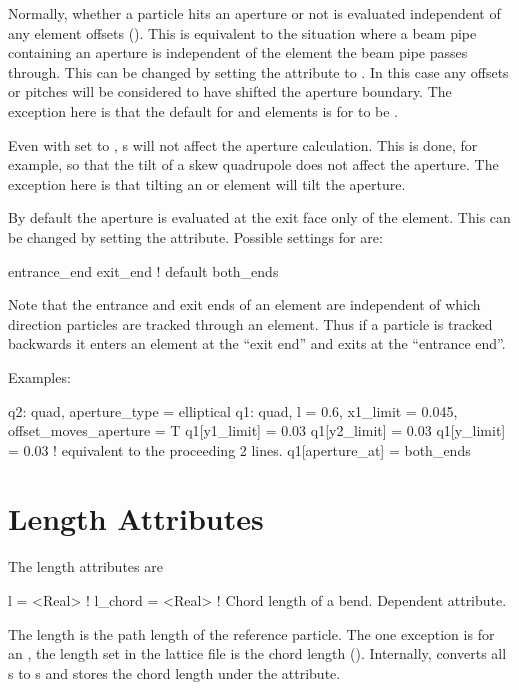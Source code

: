 Normally, whether a particle hits an aperture or not is evaluated
independent of any element offsets (). This is
equivalent to the situation where a beam pipe containing an aperture
is independent of the element the beam pipe passes through. This can
be changed by setting the  attribute to
. In this case any offsets or pitches will be considered to
have shifted the aperture boundary. The exception here is that the
default for  and  elements is for
 to be .

Even with  set to , s will
not affect the aperture calculation. This is done, for example, so
that the tilt of a skew quadrupole does not affect the aperture. The
exception here is that tilting an  or 
element will tilt the aperture.

By default the aperture is evaluated at the exit face only of the
element. This can be changed by setting the  attribute.
Possible settings for  are:
\begin{example}
  entrance_end
  exit_end  ! default
  both_ends
\end{example}
Note that the entrance and exit ends of an element are independent of
which direction particles are tracked through an element. Thus if a
particle is tracked backwards it enters an element at the ``exit end''
and exits at the ``entrance end''.

Examples:
\begin{example}
  q2: quad, aperture_type = elliptical  
  q1: quad, l = 0.6, x1_limit = 0.045, offset_moves_aperture = T
  q1[y1_limit] = 0.03
  q1[y2_limit] = 0.03
  q1[y_limit] = 0.03  ! equivalent to the proceeding 2 lines.  
  q1[aperture_at] = both_ends
\end{example}

\section{Length Attributes}
\label{s:l}

The length attributes are
\begin{example}
  l       = <Real>  ! 
  l_chord = <Real>  ! Chord length of a bend. Dependent attribute.
\end{example}
The length  is the path length of the reference particle. The
one exception is for an , the length  set in the
lattice file is the chord length (). Internally, \bmad
converts all s to s and stores the chord length
under the  attribute.

